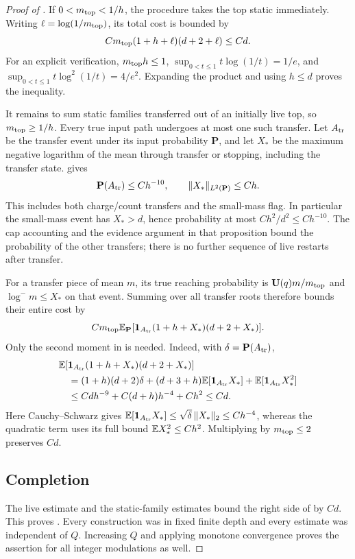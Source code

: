 \begin{proof}[Proof of ]
If $0<m_{\rm top}<1/h$, the procedure takes the top static immediately.
Writing $\ell=\log(1/m_{\rm top})$, its total cost is bounded by
\[
 Cm_{\rm top}(1+h+\ell)(d+2+\ell)\le Cd.
\]
For an explicit verification, $m_{\rm top}h\le1$,
$\sup_{0<t\le1}t\log(1/t)=1/e$, and
$\sup_{0<t\le1}t\log^2(1/t)=4/e^2$.
Expanding the product and using $h\le d$ proves the inequality.

It remains to sum static families transferred out of an initially live
top, so $m_{\rm top}\ge1/h$.  Every true input path undergoes at most
one such transfer.  Let $A_{\rm tr}$ be the transfer event under its
input probability $\mathbf P$, and let $X_*$ be the maximum negative
logarithm of the mean through transfer or stopping, including the
transfer state.   gives
\begin{equation}\label{eq:09-transfer-data}
 \mathbf P(A_{\rm tr})\le Ch^{-10},\qquad
 \|X_*\|_{L^2(\mathbf P)}\le Ch.
\end{equation}
This includes both charge/count transfers and the small-mass flag.
In particular the small-mass event has $X_*>d$, hence probability at
most $Ch^2/d^2\le Ch^{-10}$.  The cap accounting and the evidence
argument in that proposition bound the probability of the other transfers;
there is no further sequence of live restarts after transfer.

For a transfer piece of mean $m$, its true reaching probability is
$\mathbf U(q)m/m_{\rm top}$ and $\log^-m\le X_*$ on that event.
Summing  over all transfer roots therefore
bounds their entire cost by
\[
 Cm_{\rm top}\mathbb E_{\mathbf P}
       [\mathbf1_{A_{\rm tr}}(1+h+X_*)(d+2+X_*)].
\]
Only the second moment in  is needed.  Indeed,
with $\delta=\mathbf P(A_{\rm tr})$,
\begin{align*}
 &\mathbb E[\mathbf1_{A_{\rm tr}}(1+h+X_*)(d+2+X_*)]\\
 &\quad=(1+h)(d+2)\delta
       +(d+3+h)\mathbb E[\mathbf1_{A_{\rm tr}}X_*]
       +\mathbb E[\mathbf1_{A_{\rm tr}}X_*^2]\\
 &\quad\le Cdh^{-9}+C(d+h)h^{-4}+Ch^2\le Cd.
\end{align*}
Here Cauchy--Schwarz gives
$\mathbb E[\mathbf1_{A_{\rm tr}}X_*]\le\sqrt\delta\,\|X_*\|_2\le Ch^{-4}$,
whereas the quadratic term uses its full bound
$\mathbb E X_*^2\le Ch^2$.  Multiplying by $m_{\rm top}\le2$ preserves $Cd$.

\subsection*{Completion}

The live estimate  and the static-family estimates
bound the right side of  by $Cd$. This proves
.
Every construction was in fixed finite depth and every estimate was
independent of $Q$.  Increasing $Q$ and applying monotone convergence
proves the assertion for all integer modulations as well.
\end{proof}
